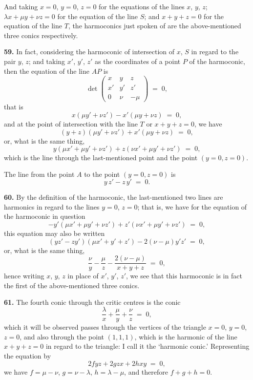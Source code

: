 \documentclass[11pt,a4paper]{article}
\begin{document}
\smallskip

And taking $x=0$, $y=0$, $z=0$ for the equations of the lines $x$, $y$, $z$; $\lambda x + \mu y + \nu z = 0$ for the equation of the line $S$; and $x+y+z=0$ for the equation of the line $T$, the harmoconics just spoken of are the above-mentioned three conics respectively.

\medskip

\textbf{59.} In fact, considering the harmoconic of intersection of $x$, $S$ in regard to the pair $y$, $z$; and taking $x'$, $y'$, $z'$ as the coordinates of a point $P$ of the harmoconic, then the equation of the line $AP$ is
\[
\det\begin{pmatrix}x & y & z\\ x' & y' & z'\\ 0 & \nu & -\mu\end{pmatrix} \;=\; 0,
\]
that is
\[
x(\mu y' + \nu z') - x'(\mu y + \nu z) \;=\; 0,
\]
and at the point of intersection with the line $T$ or $x+y+z=0$, we have
\[
(y+z)(\mu y' + \nu z') + x'(\mu y + \nu z) \;=\; 0,
\]
or, what is the same thing,
\[
y(\mu x' + \mu y' + \nu z') + z(\nu x' + \mu y' + \nu z') \;=\; 0,
\]
which is the line through the last-mentioned point and the point $(y=0,z=0)$.

The line from the point $A$ to the point $(y=0,z=0)$ is
\[
y\,z' - z\,y' \;=\; 0.
\]

\medskip

\textbf{60.} By the definition of the harmoconic, the last-mentioned two lines are harmonics in regard to the lines $y=0$, $z=0$; that is, we have for the equation of the harmoconic in question
\[
-y'(\mu x' + \mu y' + \nu z') + z'(\nu x' + \mu y' + \nu z') \;=\; 0,
\]
this equation may also be written
\[
(y z' - z y')(\mu x' + y' + z') - 2(\nu - \mu)y' z' \;=\; 0,
\]
or, what is the same thing,
\[
\frac{\nu}{y} - \frac{\mu}{z} - \frac{2(\nu-\mu)}{x+y+z} \;=\; 0,
\]
hence writing $x$, $y$, $z$ in place of $x'$, $y'$, $z'$, we see that this harmoconic is in fact the first of the above-mentioned three conics.

\medskip

\textbf{61.} The fourth conic through the critic centres is the conic
\[
\frac{\lambda}{x} + \frac{\mu}{y} + \frac{\nu}{z} \;=\; 0,
\]
which it will be observed passes through the vertices of the triangle $x=0$, $y=0$, $z=0$, and also through the point $(1,1,1)$, which is the harmonic of the line $x+y+z=0$ in regard to the triangle: I call it the `harmonic conic.' Representing the equation by
\[
2 f y z + 2 g z x + 2 h x y \;=\; 0,
\]
we have $f=\mu-\nu$, $g=\nu-\lambda$, $h=\lambda-\mu$, and therefore $f+g+h=0$.
\end{document}
